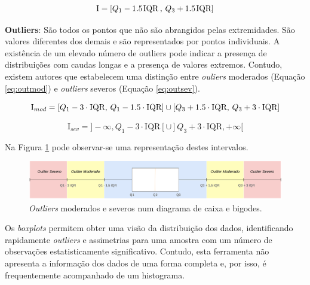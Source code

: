 \begin{my_itemize}
		\begin{equation}
			\text{I} = [Q_1 - 1.5 \hspace{1px} \text{IQR} \hspace{2px} , \hspace{2px} Q_3 + 1.5 \hspace{1px} \text{IQR}]
			\label{eq:out}
		\end{equation} 
	
	\item \textbf{Outliers}: São todos os pontos que não são abrangidos pelas extremidades. São valores diferentes dos demais e são representados por pontos individuais. A existência de um elevado número de outliers pode indicar a presença de distribuições com caudas longas e a presença de valores extremos. 
	Contudo, existem autores que estabelecem uma distinção entre \textit{ouliers} moderados (Equação \ref{eq:outmod}) e \textit{outliers} severos (Equação \ref{eq:outsev})\cite{spe}.
	
	
	\begin{equation}
		\text{I}_{mod} = [Q_1 - 3 \cdot\text{IQR} , \hspace{2px} Q_1 - 1.5 \cdot\text{IQR}] \cup 
		[Q_3 + 1.5 \cdot\text{IQR} , \hspace{2px} Q_3 + 3 \cdot\text{IQR}]
		\label{eq:outmod}
	\end{equation}
	
	\begin{equation}
		\text{I}_{sev} = ] -\infty, Q_1 - 3 \cdot\text{IQR}[ \cup ]Q_3 + 3 \cdot\text{IQR},+\infty[
		\label{eq:outsev}
	\end{equation}
	
	Na Figura \ref{fig:outliers} pode observar-se uma representação destes intervalos.
	
\end{my_itemize}

\begin{figure}[H]
	\centering
	\includegraphics[width=\textwidth]{imagens/boxplot.png}
	\caption{\textit{Outliers} moderados e severos num diagrama de caixa e bigodes.}
	\label{fig:outliers}
\end{figure}

Os \textit{boxplots} permitem obter uma visão da distribuição dos dados, identificando rapidamente \textit{outliers} e assimetrias para uma amostra com um número de observações estatisticamente significativo. Contudo, esta ferramenta não apresenta a informação dos dados de uma forma completa e, por isso, é frequentemente acompanhado de um histograma.

